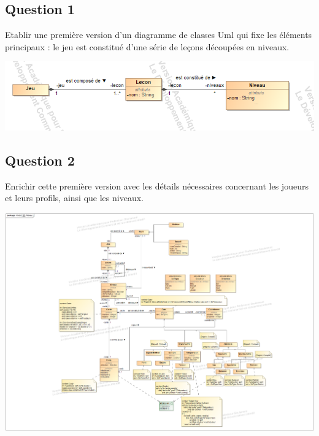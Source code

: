 \documentclass[11pt]{article}
\begin{document}
\subsection{Question 1}
Etablir une première version d'un diagramme de classes Uml qui fixe les éléments principaux : le jeu est constitué d'une série de leçons découpées en niveaux.

\includegraphics[scale=0.5]{Plateau_5_1.png}

\subsection{Question 2}
Enrichir cette première version avec les détails nécessaires concernant les joueurs et leurs profils, ainsi que les niveaux. 

\includegraphics[width=15 cm,height=18.5 cm]{Plateau.png}
\end{document}
